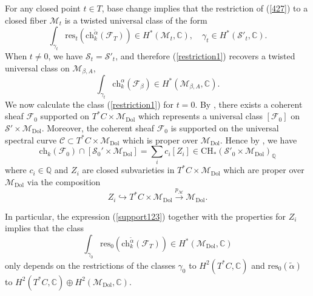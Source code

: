 \documentclass[11pt]{amsart}
\theoremstyle{plain}
\theoremstyle{definition}
\theoremstyle{remark}
\newcommand{\BC}{{\mathbb{C}}}
\newcommand{\BQ}{{\mathbb{Q}}}
\newcommand{\CC}{{\mathcal C}}
\newcommand{\CF}{{\mathcal F}}
\newcommand{\CM}{{\mathcal M}}
\newcommand{\CS}{{\mathcal S}}
\begin{document}
For any closed point $t \in T$, base change \cite[Proposition 1.7]{Fulton} implies that the restriction of (\ref{427}) to a closed fiber $\CM_t$ is a twisted universal class of the form 
\begin{equation}\label{restriction1}
\int_{\gamma_t} \mathrm{res}_t\left( \mathrm{ch}_k^{\tilde{\alpha}} \left(\CF_T\right)\right) \in H^*(\CM_t, \BC),\quad \gamma_t \in H^*(\CS'_t, \BC).
\end{equation}
When $t \neq 0$, we have $\CS_t= \CS'_t$, and therefore (\ref{restriction1}) recovers a twisted universal class on $\CM_{\beta,A}$,
\[
\int_{\gamma_t} \mathrm{ch}_k^\alpha (\CF_\beta) \in H^*(\CM_{\beta,A}, \BC).
\]
We now calculate the class (\ref{restriction1}) for $t =0$. By \cite[Theorem 4.6.5]{HL}, there exists a coherent sheaf $\CF_0$ supported on $T^*C \times \CM_{\mathrm{Dol}}$ which represents a universal class $[\CF_0]$ on $\CS'\times \CM_{\mathrm{Dol}}$. Moreover, the coherent sheaf $\CF_0$ is supported on the universal spectral curve $\CC \subset T^*C \times \CM_{\mathrm{Dol}}$ which is proper over $\CM_{\mathrm{Dol}}$. Hence by \cite[Property 2.1]{BFM}, we have
\begin{equation}\label{support123}
\mathrm{ch}_k(\CF_0) \cap [\CS_0'\times \CM_{\mathrm{Dol}}] = \sum_i c_i [Z_i] \in \mathrm{CH}_*(\CS'_0 \times \CM_{\mathrm{Dol}})_\BQ
\end{equation}
where $c_i \in \BQ$ and $Z_i$ are closed subvarieties in $T^*C \times \CM_{\mathrm{Dol}}$ which are proper over $\CM_{\mathrm{Dol}}$ via the composition
 \begin{equation}\label{composition1}
 Z_i \hookrightarrow T^*C \times \CM_{\mathrm{Dol}} \xrightarrow{p_\CM} \CM_{\mathrm{Dol}}. 
 \end{equation}
 
 
 
In particular, the expression (\ref{support123}) together with the properties for $Z_i$ implies that the class 
\[
\int_{\gamma_0} \mathrm{res}_0\left( \mathrm{ch}_k^{\tilde{\alpha}} \left(\CF_T\right)\right) \in H^*(\CM_{\mathrm{Dol}}, \BC)
\]
only depends on the restrictions of the classes {$\gamma_0$  to $H^2(T^*C, \BC)$ and
 $\mathrm{res}_0(\tilde{\alpha})$ to  $H^2(T^*C, \BC)\oplus H^2(\CM_{\mathrm{Dol}}, \BC)$}. 
 
\end{document}
